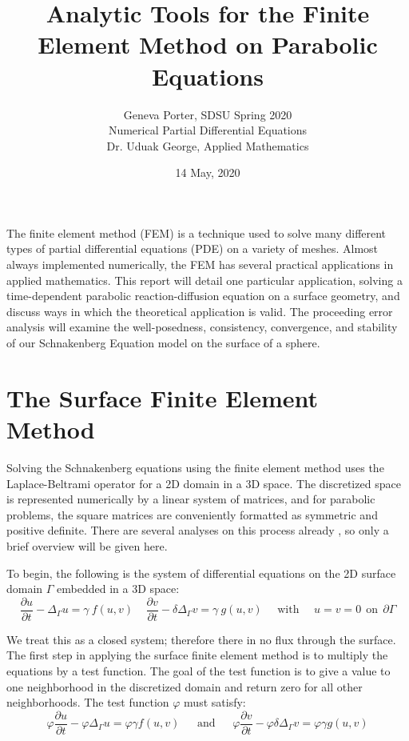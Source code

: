 \documentclass[12pt]{article}
\title{Analytic Tools for the Finite Element Method on Parabolic Equations}
\author{Geneva Porter, SDSU Spring 2020\\ 
Numerical Partial Differential Equations\\
Dr. Uduak George, Applied Mathematics}
\date{14 May, 2020}
\begin{document}
\maketitle

The finite element method (FEM) is a technique used to solve many different types of partial differential equations (PDE) on a variety of meshes. Almost always implemented numerically, the FEM has several practical applications in applied mathematics. This report will detail one particular application, solving a time-dependent parabolic reaction-diffusion equation on a surface geometry, and discuss ways in which the theoretical application is valid. The proceeding error analysis will examine the well-posedness, consistency, convergence, and stability of our Schnakenberg Equation model on the surface of a sphere. 

\section{The Surface Finite Element Method}\label{sec:SFEM}

Solving the Schnakenberg equations using the finite element method uses the Laplace-Beltrami operator for a 2D domain in a 3D space. The discretized space is represented numerically by a linear system of matrices, and for parabolic problems, the square matrices are conveniently formatted as symmetric and positive definite. There are several analyses on this process already \cite{Dziuk2012}, so only a brief overview will be given here. 

To begin, the following is the system of differential equations on the 2D surface domain $\Gamma$ embedded in a 3D space:
\begin{equation}
\frac{\partial u}{\partial t} - \Delta_\Gamma u = \gamma~f(u,v) ~~~~~
\frac{\partial v}{\partial t} - \delta\Delta_\Gamma v = \gamma~g(u,v) ~~~~~~ \text{with} ~~~~~~ u = v = 0 ~~ \text{on} ~~ \partial\Gamma
\end{equation}

We treat this as a closed system; therefore there in no flux through the surface. The first step in applying the surface finite element method is to multiply the equations by a test function. The goal of the test function is to give a value to one neighborhood in the discretized domain and return zero for all other neighborhoods. The test function $\varphi$ must satisfy:
\begin{equation}
\varphi\frac{\partial u}{\partial t} - \varphi\Delta_\Gamma u = \varphi\gamma f(u,v) ~~~~~~~ \text{and} ~~~~~~~
\varphi\frac{\partial v}{\partial t} - \varphi\delta\Delta_\Gamma v = \varphi\gamma g(u,v)
\end{equation}
\end{document}
